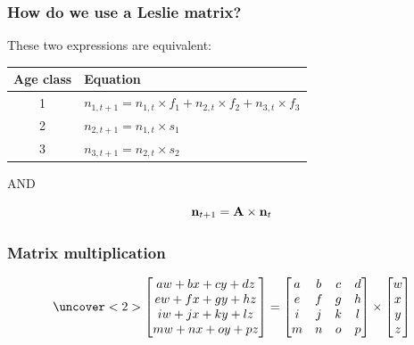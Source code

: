 \documentclass[color=usenames,dvipsnames]{beamer}\usepackage[]{graphicx}\usepackage[]{color}
\begin{document}
\begin{frame}
  \frametitle{How do we use a Leslie matrix?}
  \large
  These two expressions are equivalent: \par
  \vspace{0.5cm}
  \begin{tabular}{cl}
    \hline
    Age class & Equation \\
    \hline
    1 & $n_{1,t+1} = n_{1,t} \times f_{1} + n_{2,t} \times f_{2} + n_{3,t} \times f_3$ \\
    2 & $n_{2,t+1} = n_{1,t} \times s_{1}$ \\
    3 & $n_{3,t+1} = n_{2,t} \times s_{2}$ \\
    \hline
  \end{tabular}
  \vfill
  {\centering AND \par}
  \vfill
  \[
    {\bf n}_{t+1} = {\bf A}\times {\bf n}_{t}
  \]
\end{frame}



\begin{frame}
  \frametitle{Matrix multiplication}
  \Large
  \begin{center}
    \[
    \uncover<2>{ %
    \begin{bmatrix}
      aw + bx + cy + dz \\
      ew + fx + gy + hz \\
      iw + jx + ky + lz \\
      mw + nx + oy + pz
    \end{bmatrix}
    } =
    \begin{bmatrix}
      a & b & c & d \\
      e & f & g & h \\
      i & j & k & l \\
      m & n & o & p
    \end{bmatrix}
    \times
    \begin{bmatrix}
      w \\
      x \\
      y \\
      z
    \end{bmatrix}
    \]
  \end{center}
\end{frame}
\end{document}
